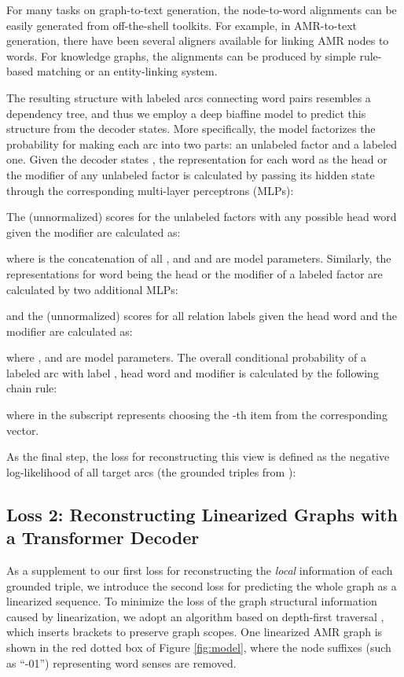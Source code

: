 \documentclass[11pt,a4paper]{article}
\begin{document}
For many tasks on graph-to-text generation, the node-to-word alignments can be easily generated from off-the-shell toolkits.
For example, in AMR-to-text generation, there have been several aligners \citep{pourdamghani2014aligning,flanigan2016cmu,wang2017getting,liu2018amr,szubert2018structured} available for linking AMR nodes to words.
For knowledge graphs, the alignments can be produced by simple rule-based matching or an entity-linking system.


The resulting structure with labeled arcs connecting word pairs resembles a dependency tree, and thus we employ a deep biaffine model \citep{dozat2016deep} to predict this structure from the decoder states.
More specifically, the model factorizes the probability for making each arc into two parts: an unlabeled factor and a labeled one.
Given the decoder states , the representation for each word  as the head or the modifier of any unlabeled factor is calculated by passing its hidden state  through the corresponding multi-layer perceptrons (MLPs):

The (unnormalized) scores for the unlabeled factors with any possible head
word given the modifier  are calculated as:

where  is the concatenation of all , and  and  are model parameters.
Similarly, the representations for word  being the head or the modifier of a labeled factor are calculated by two additional MLPs:

and the (unnormalized) scores for all relation labels given the head word 
and the modifier  are calculated as:

where ,  and  are model parameters.
The overall conditional probability of a labeled arc with label , head word  and modifier  is calculated by the following chain rule:

where  in the subscript represents choosing the -th item from the corresponding vector.


As the final step, the loss for reconstructing this view is defined as the negative log-likelihood of all target arcs  (the grounded triples from ):



\subsection{Loss 2: Reconstructing Linearized Graphs with a Transformer Decoder}


As a supplement to our first loss for reconstructing the \emph{local} information of each grounded triple, we introduce the second loss for predicting the whole graph as a linearized sequence.
To minimize the loss of the graph structural information caused by linearization, we adopt an algorithm based on depth-first traversal \citep{konstas2017neural}, which inserts brackets to preserve graph scopes.
One linearized AMR graph is shown in the red dotted box of Figure \ref{fig:model}, where the node suffixes (such as ``-01'') representing word senses are removed.
\end{document}
